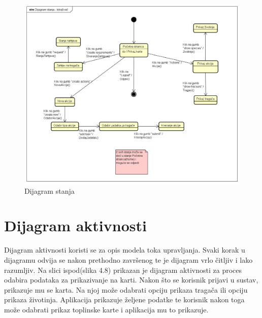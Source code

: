 			\begin{figure}[H]
				\includegraphics[scale=0.5]{slike/dijagram_stanja.PNG} %
				\centering
				\caption{Dijagram stanja}
				\label{fig:promjene}
			\end{figure}
			
			\eject 
		
		\section{Dijagram aktivnosti}
			
			\noindent Dijagram aktivnosti koristi se za opis modela toka upravljanja. Svaki korak u dijagramu odvija se nakon prethodno završenog te je dijagram vrlo čitljiv i lako razumljiv. Na slici ispod(slika 4.8) prikazan je dijagram aktivnosti za proces odabira podataka za prikazivanje na karti. Nakon što se korisnik prijavi u sustav, prikazuje mu se karta. Na njoj može odabrati opciju prikaza tragača ili opciju prikaza životinja. Aplikacija prikazuje željene podatke te korisnik nakon toga može odabrati prikaz toplinske karte i aplikacija mu to prikazuje.
			

